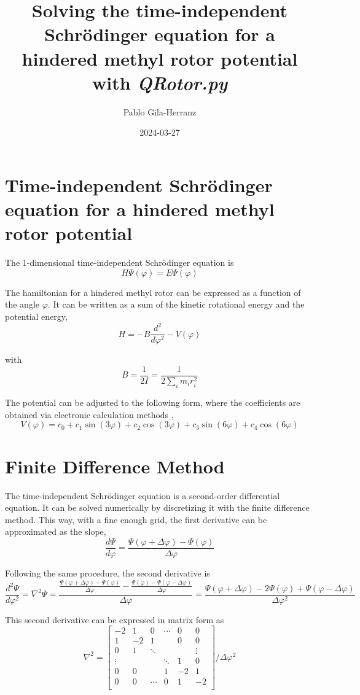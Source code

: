 \documentclass[12pt,a4paper]{article}
\title{Solving the time-independent Schrödinger equation for a hindered methyl rotor potential with \textit{QRotor.py}}
\author{Pablo Gila-Herranz}
\date{2024-03-27}
\begin{document}
\maketitle


\section*{Time-independent Schrödinger equation for a hindered methyl rotor potential}

The 1-dimensional time-independent Schrödinger equation is
$$
H\Psi(\varphi)=E\Psi(\varphi)
$$

The hamiltonian for a hindered methyl rotor can be expressed as a function of the angle $\varphi$.
It can be written as a sum of the kinetic rotational energy and the potential energy,
$$
H = -B \frac{d^2}{d\varphi^2} - V(\varphi)
$$

with
$$
B = \frac{1}{2I}=\frac{1}{2\sum_{i}m_{i}r_{i}^{2}}
$$

The potential can be adjusted to the following form, where the coefficients are obtained via electronic calculation methods \cite{titov2023},
$$
V(\varphi)=c_{0}+c_{1}\sin(3\varphi)+c_{2}\cos(3\varphi)+c_{3}\sin(6\varphi)+c_{4}\cos(6\varphi)
$$


\section*{Finite Difference Method}

The time-independent Schrödinger equation is a second-order differential equation.
It can be solved numerically by discretizing it with the finite difference method.
This way, with a fine enough grid, the first derivative can be approximated as the slope,
$$
\frac{d\Psi}{d\varphi} = \frac{\Psi(\varphi+\Delta\varphi)-\Psi(\varphi)}{\Delta\varphi}
$$

Following the same procedure, the second derivative is
$$
\frac{d^2\Psi}{d\varphi^2} = \nabla^2\Psi = \frac{\frac{\Psi(\varphi+\Delta\varphi)-\Psi(\varphi)}{\Delta\varphi} - \frac{\Psi(\varphi)-\Psi(\varphi-\Delta\varphi)}{\Delta\varphi}}{\Delta\varphi} = \frac{\Psi(\varphi+\Delta\varphi)-2\Psi(\varphi)+\Psi(\varphi-\Delta\varphi)}{\Delta\varphi^2}
$$

This second derivative can be expressed in matrix form as
\[
    \nabla^2 =
    \left[ {\begin{array}{cccccc}
    -2      &  1     &  0     & \cdots &  0    &  0      \\
     1      & -2     &  1     &        &  0    &  0      \\
     0      &  1     & \ddots &        &       &  \vdots \\
     \vdots &        &        & \ddots &  1    &  0      \\
     0      &  0     &        &  1     & -2    &  1      \\
     0      &  0     & \cdots &  0     &  1    & -2      \\
    \end{array} } \right] / \Delta\varphi^2
\]
\end{document}
